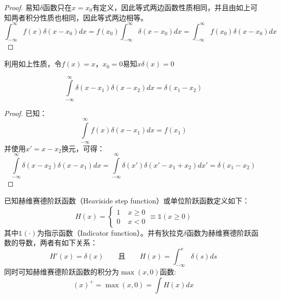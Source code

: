 \documentclass[11pt]{article}
\begin{document}
\begin{proof}
    易知$\delta$函数只在$x=x_0$有定义，因此等式两边函数性质相同，并且由如上可知两者积分性质也相同，因此等式两边相等。
    \begin{equation*}
        \int^{\infty}_{-\infty} f(x)\delta(x-x_0) dx 
        = f(x_0) \int^{\infty}_{-\infty} \delta(x-x_0) dx
        = \int^{\infty}_{-\infty} f(x_0)\delta(x-x_0) dx
    \end{equation*}
\end{proof}
利用如上性质，令$f(x)=x$，$x_0=0$易知$x\delta(x)=0$

\begin{corollary}
    \begin{equation*}
        \int\limits^{\infty}_{-\infty} \delta(x-x_1) \delta(x-x_2) dx = \delta(x_1-x_2)
    \end{equation*}
\end{corollary}

\begin{proof}
    已知：
    \begin{equation*}
        \int\limits^{\infty}_{-\infty} f(x) \delta(x-x_1) dx = f(x_1)
    \end{equation*}
    并使用$x'=x-x_2$换元，可得：
    \begin{equation*}
        \int\limits^{\infty}_{-\infty} \delta(x-x_2) \delta(x-x_1) dx
        = \int\limits^{\infty}_{-\infty} \delta(x') \delta(x'-x_1+x_2) dx'
        = \delta(x_1-x_2)
    \end{equation*}
\end{proof}

\begin{corollary}
    已知赫维赛德阶跃函数（Heaviside step function）或单位阶跃函数定义如下：
    \begin{equation*}
        H(x) =
        \begin{cases}
            1 \; & x \geq 0 \\
            0 \; & x<0
        \end{cases}
        \equiv \mathbb{1}(x \geq 0)
    \end{equation*}
    其中$\mathbb{1}(\cdot)$为指示函数（Indicator function）。并有狄拉克$\delta$函数为赫维赛德阶跃函数的导数，两者有如下关系：
    \begin{equation*}
        H'(x) = \delta(x) \qquad \text{且} \qquad H(x) = \int^{x}_{-\infty}\delta(s)ds
    \end{equation*}
    同时可知赫维赛德阶跃函数的积分为$\max(x,0)$函数:
    \begin{equation*}
        (x)^+ = \max(x,0) = \int H(x) dx
    \end{equation*}
\end{corollary}
\end{document}
